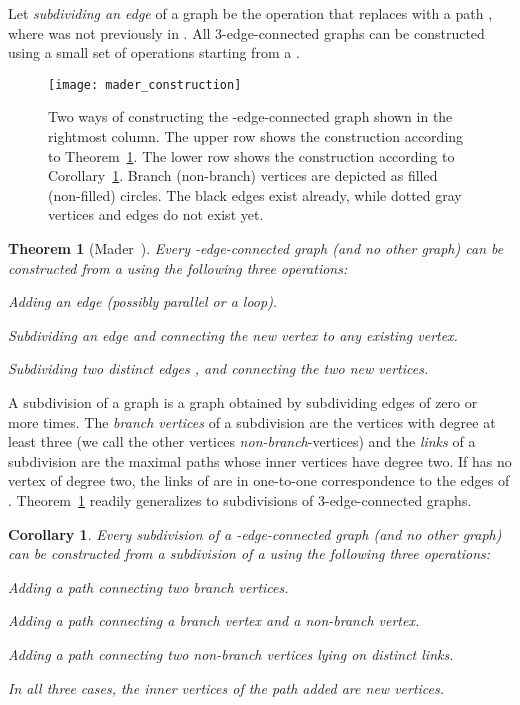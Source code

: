 \documentclass[paper=a4]{scrartcl}
\newtheorem{theorem}{Theorem}
\newtheorem{corollary}{Corollary}
\begin{document}
Let \emph{subdividing an edge}  of a graph  be the operation that replaces  with a path , where  was not previously in . All 3-edge-connected graphs can be constructed using a small set of operations starting from a .

\begin{figure}[htbp]
\centering
\texttt{[image: mader\_construction]}
\caption{Two ways of constructing the -edge-connected graph shown in the rightmost column. The upper row shows the construction according to Theorem~\ref{Mader}. The lower row shows the construction according to Corollary~\ref{Mader-Cor}. Branch (non-branch) vertices are depicted as filled (non-filled) circles. The black edges exist already, while dotted gray vertices and edges do not exist yet. }
\label{fig:mader_construction}
\end{figure}

\begin{theorem}[Mader~\cite{Mader1978}]\label{Mader}
Every -edge-connected graph (and no other graph) can be constructed from a  using the following three operations:
\begin{compactitem}
\item Adding an edge (possibly parallel or a loop).
\item Subdividing an edge  and connecting the new vertex to any existing vertex.
\item Subdividing two distinct edges ,  and connecting the two new vertices.
\end{compactitem}
\end{theorem}

A subdivision  of a graph  is a graph obtained by subdividing edges of  zero or more times. The \emph{branch vertices} of a subdivision are the vertices with degree at least three (we call the other vertices \emph{non-branch}-vertices) and the \emph{links} of a subdivision are the maximal paths whose inner vertices have degree two. If  has no vertex of degree two, the links of  are in one-to-one correspondence to the edges of . Theorem~\ref{Mader} readily generalizes to subdivisions of 3-edge-connected graphs.

\begin{corollary}\label{Mader-Cor}
Every subdivision of a -edge-connected graph (and no other graph) can be constructed from a
subdivision of a  using the following three operations:
\begin{compactitem}
\item Adding a path connecting two branch vertices.
\item Adding a path connecting a branch vertex and a non-branch vertex.
\item Adding a path connecting two non-branch vertices lying on distinct links.
\end{compactitem}
In all three cases, the inner vertices of the path added are new vertices.
\end{corollary}
\end{document}
